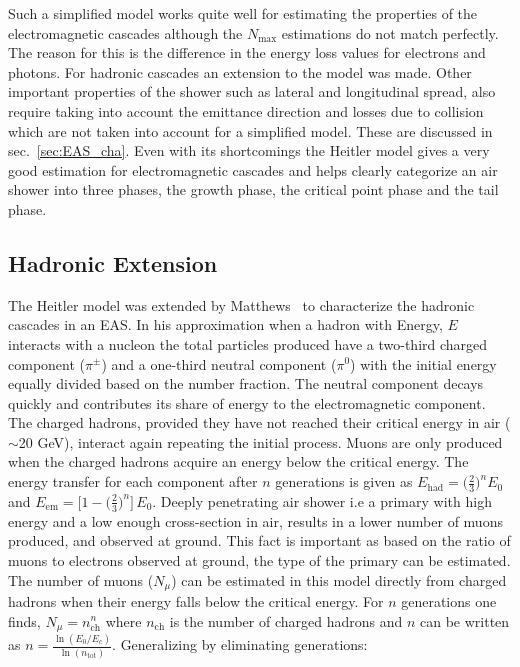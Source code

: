Such a simplified model works quite well for estimating the properties of the electromagnetic cascades although the $N_{\text{max}}$ estimations do not match perfectly. The reason for this is the difference in the energy loss values for electrons and photons. For hadronic cascades an extension to the model was made. Other important properties of the shower such as lateral and longitudinal spread, also require taking into account the emittance direction and losses due to collision which are not taken into account for a simplified model. These are discussed in sec.~\ref{sec:EAS_cha}. Even with its shortcomings the Heitler model gives a very good estimation for electromagnetic cascades and helps clearly categorize an air shower into three phases, the growth phase, the critical point phase and the tail phase. 

\subsection{Hadronic Extension}
\label{sec:Dev_Had}
The Heitler model was extended by Matthews~\cite{MATTHEWS2005387} to characterize the hadronic cascades in an EAS. In his approximation when a hadron with Energy, $E$ interacts with a nucleon the total particles produced have a two-third charged component ($\pi^\pm $) and a one-third neutral component ($\pi^0$) with the initial energy equally divided based on the number fraction. The neutral component decays quickly and contributes its share of energy to the electromagnetic component. The charged hadrons, provided they have not reached their critical energy in air ($\sim$20 GeV), interact again repeating the initial process. Muons are only produced when the charged hadrons acquire an energy below the critical energy. The energy transfer for each component after $n$ generations is given as $E_{\text{had}} = \biggl(\frac{2}{3}\biggr)^n E_0$ and $E_{\text{em}} = \big[1- \biggl(  \frac{2}{3}\biggr)^n\big] \, E_0$. Deeply penetrating air shower i.e a primary with high energy and a low enough cross-section in air, results in a lower number of muons produced, and observed at ground. This fact is important as based on the ratio of muons to electrons observed at ground, the type of the primary can be estimated. The number of muons ($N_{\mu}$) can be estimated in this model directly from charged hadrons when their energy falls below the critical energy. For $n$ generations one finds, $N_{\mu} = n_{\text{ch}}^n$ where $n_{\text{ch}}$ is the number of charged hadrons and $n$ can be written as $n = \frac{\ln(E_0/E_c)}{\ln(n_{\text{tot}})}$. Generalizing by eliminating generations:

